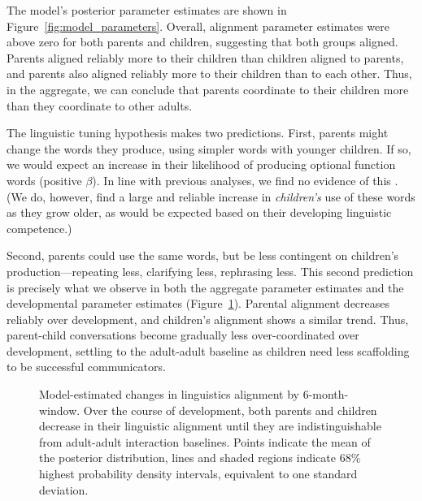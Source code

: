 \documentclass[10pt,letterpaper]{article}
\begin{document}
The model's posterior parameter estimates are shown in  Figure~\ref{fig:model_parameters}. Overall, alignment parameter estimates were above zero for both parents and children, suggesting that both groups aligned. Parents aligned reliably more to their children than children aligned to parents, and parents also aligned reliably more to their children than to each other. Thus, in the aggregate, we can conclude that parents coordinate to their children more than they coordinate to other adults.

The linguistic tuning hypothesis makes two predictions. First, parents might change the words they produce, using simpler words with younger children. If so, we would expect an increase in their likelihood of producing optional function words (positive $\beta$). In line with previous analyses, we find no evidence of this \cite{newport1977, hayes1988}. (We do, however, find a large and reliable increase in \emph{children's} use of these words as they grow older, as would be expected based on their developing linguistic competence.)

Second, parents could use the same words, but be less contingent on children's production---repeating less, clarifying less, rephrasing less. This second prediction is precisely what we observe in both the aggregate parameter estimates and the developmental parameter estimates (Figure~\ref{fig:all_hpds}). Parental alignment decreases reliably over development, and children's alignment shows a similar trend. Thus, parent-child conversations become gradually less over-coordinated over development, settling to the adult-adult baseline as children need less scaffolding to be successful communicators.

\begin{figure}[t]
	\caption{Model-estimated changes in linguistics alignment by 6-month-window. Over the course of development, both parents and children decrease in their linguistic alignment until they are indistinguishable from adult-adult interaction baselines. Points indicate the mean of the posterior distribution, lines and shaded regions indicate 68\% highest probability density intervals, equivalent to one standard deviation.
\label{fig:all_hpds} }
\end{figure}
\end{document}
